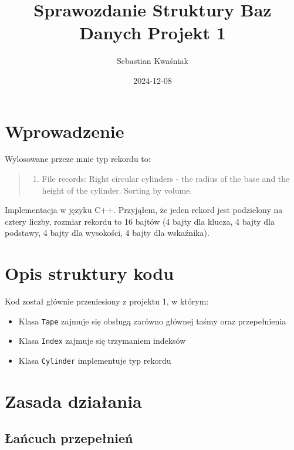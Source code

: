 \documentclass[
]{article}
\title{Sprawozdanie Struktury Baz Danych Projekt 1}
\author{Sebastian Kwaśniak}
\date{2024-12-08}
\providecommand{\tightlist}{%
  \setlength{\itemsep}{0pt}\setlength{\parskip}{0pt}}
\begin{document}
\maketitle

\renewcommand{\figurename}{Rys.}

\section{Wprowadzenie}\label{wprowadzenie}

Wylosowane przeze mnie typ rekordu to:

\begin{quote}
\begin{enumerate}
\def\labelenumi{\arabic{enumi}.}
\setcounter{enumi}{28}
\tightlist
\item
  File records: Right circular cylinders - the radius of the base and
  the height of the cylinder. Sorting by volume.
\end{enumerate}
\end{quote}

Implementacja w języku C++. Przyjąłem, że jeden rekord jest podzielony
na cztery liczby, rozmiar rekordu to 16 bajtów (4 bajty dla klucza, 4
bajty dla podstawy, 4 bajty dla wysokości, 4 bajty dla wskaźnika).

\section{Opis struktury kodu}\label{opis-struktury-kodu}

Kod został głównie przeniesiony z projektu 1, w którym:

\begin{itemize}
\tightlist
\item
  Klasa \texttt{Tape} zajmuje się obsługą zarówno głównej taśmy oraz
  przepełnienia
\item
  Klasa \texttt{Index} zajmuje się trzymaniem indeksów
\item
  Klasa \texttt{Cylinder} implementuje typ rekordu
\end{itemize}

\section{Zasada działania}\label{zasada-dziaux142ania}

\subsection{Łańcuch
przepełnień}\label{ux142aux144cuch-przepeux142nieux144}
\end{document}
